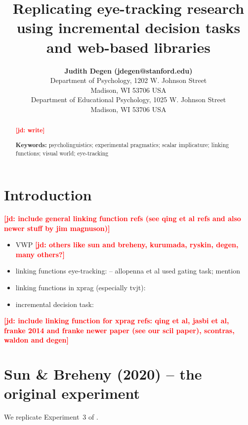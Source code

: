 \documentclass[10pt,letterpaper]{article}
\title{Replicating eye-tracking research using incremental decision tasks and web-based libraries}
\author{{\large \bf Judith Degen (jdegen@stanford.edu)} \\
  Department of Psychology, 1202 W. Johnson Street \\
  Madison, WI 53706 USA
  \AND {\large \bf Leyla Kursat (lkursat@stanford.edu)} \\
  Department of Educational Psychology, 1025 W. Johnson Street \\
  Madison, WI 53706 USA}
\newcommand{\expref}[1]{Experiment~#1}
\newcommand{\jd}[1]{\textcolor{Red}{\textbf{[jd: #1]}}}
\begin{document}
\maketitle


\begin{abstract}

\jd{write}

\textbf{Keywords:} 
psycholinguistics; experimental pragmatics;  scalar implicature; linking functions; visual world; eye-tracking
\end{abstract}


\section{Introduction}

\jd{include general linking function refs (see qing et al refs and also newer stuff by jim magnuson)}
\begin{itemize}
	\item VWP \cite<VWP,>{tanenhaus1995,SedivyEtAl1999:Achieving-Incremental-Semantic-, LeffelXiangKennedy2016:Imprecision-is-Pragmatic-} \jd{others like sun and breheny, kurumada, ryskin, degen, many others?} 
	\item linking functions eye-tracking:  -- allopenna et al used gating task; mention
	\item linking functions in xprag (especially tvjt): \cite{Jasbi2019, WaldonDegen2020, franke2014typical, savinelli2018, franke2016link, scholler2017semantic, tessler2019language}
	\item incremental decision task: \cite{AllopennaEtAl1998:Tracking-the-Time-,QingLD2018, KreissDegen2020}
\end{itemize}

\jd{include linking function for xprag refs: qing et al, jasbi et al, franke 2014 and franke newer paper (see our scil paper), scontras, waldon and degen}

\section{Sun \& Breheny (2020) -- the original experiment}

We replicate \expref{3} of .
\end{document}
